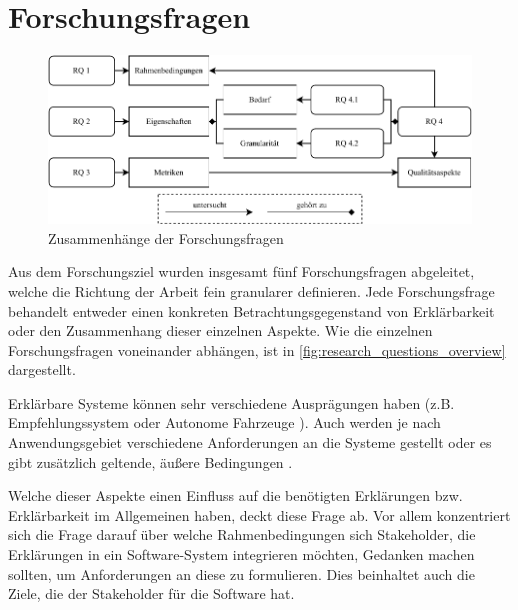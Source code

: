 \section{Forschungsfragen}

\begin{figure}[htb!]
    \includegraphics{contents/03_research_design/res/research_questions_overview.pdf}
    \caption{Zusammenhänge der Forschungsfragen}
    \label{fig:research_questions_overview}
\end{figure}

Aus dem Forschungsziel wurden insgesamt fünf Forschungsfragen abgeleitet, welche die Richtung der Arbeit fein granularer definieren. Jede Forschungsfrage behandelt entweder einen konkreten Betrachtungsgegenstand von Erklärbarkeit oder den Zusammenhang dieser einzelnen Aspekte. Wie die einzelnen Forschungsfragen voneinander abhängen, ist in \autoref{fig:research_questions_overview} dargestellt.

\smallskip

\noindent{}

\smallskip

Erklärbare Systeme können sehr verschiedene Ausprägungen haben (z.B. Empfehlungssystem \cite{nunes_systematic_2017} oder Autonome Fahrzeuge \cite{wiegand2019drive}). Auch werden je nach Anwendungsgebiet verschiedene Anforderungen an die Systeme gestellt oder es gibt zusätzlich geltende, äußere Bedingungen \cite{chazette_knowledge_nodate}.

Welche dieser Aspekte einen Einfluss auf die benötigten Erklärungen bzw. Erklärbarkeit im Allgemeinen haben, deckt diese Frage ab. Vor allem konzentriert sich die Frage darauf über welche Rahmenbedingungen sich Stakeholder, die Erklärungen in ein Software-System integrieren möchten, Gedanken machen sollten, um Anforderungen an diese zu formulieren. Dies beinhaltet auch die Ziele, die der Stakeholder für die Software hat.

